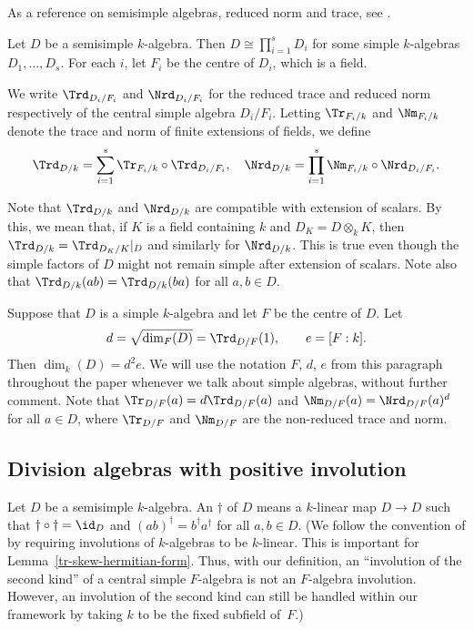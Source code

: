 As a reference on semisimple algebras, reduced norm and trace, see \cite[\S9]{Rei75}.

Let $D$ be a semisimple $k$-algebra.
Then $D \cong \prod_{i=1}^s D_i$ for some simple $k$-algebras $D_1, \dotsc, D_s$.
For each $i$, let $F_i$ be the centre of $D_i$, which is a field.

We write $\Trd_{D_i/F_i}$ and $\Nrd_{D_i/F_i}$ for the reduced trace and reduced norm respectively of the central simple algebra $D_i/F_i$.
Letting $\Tr_{F_i/k}$ and $\Nm_{F_i/k}$ denote the trace and norm of finite extensions of fields, we define\vspace*{-3pt}
\[
\Trd_{D/k} = \sum_{i=1}^s \Tr_{F_i/k} \circ \Trd_{D_i/F_i}, \quad \Nrd_{D/k} = \prod_{i=1}^s \Nm_{F_i/k} \circ \Nrd_{D_i/F_i}.
\]

Note that $\Trd_{D/k}$ and $\Nrd_{D/k}$ are compatible with extension of scalars.
By this, we mean that, if $K$ is a field containing $k$ and $D_K = D \otimes_k K$, then $\Trd_{D/k} = \Trd_{D_K/K}|_D$ and similarly for $\Nrd_{D/k}$.
This is true even though the simple factors of $D$ might not remain simple after extension of scalars.
Note also that $\Trd_{D/k}(ab) = \Trd_{D/k}(ba)$ for all $a, b \in D$.

Suppose that $D$ is a simple $k$-algebra and let $F$ be the centre of $D$.
Let\vspace*{-3pt}
\[
d = \sqrt{\dim_F(D)} = \Trd_{D/F}(1), \qquad e = [F:k].
\]
Then $\dim_k(D) = d^2e$.
We will use the notation $F$, $d$, $e$ from this paragraph throughout the paper whenever we talk about simple algebras, without further comment.
Note that $\Tr_{D/F}(a) = d\Trd_{D/F}(a)$ and $\Nm_{D/F}(a) = \Nrd_{D/F}(a)^d$ for all $a \in D$, where $\Tr_{D/F}$ and $\Nm_{D/F}$ are the non-reduced trace and norm.

\subsection{Division algebras with positive involution} \label{subsec:albert}

Let $D$ be a semisimple $k$\nobreakdash-alge\-bra.
An  $\dag$ of $D$ means a $k$-linear map $D \to D$ such that $\dag \circ \dag = \id_D$ and $(ab)^\dag = b^\dag a^\dag$ for all $a,b \in D$.
(We follow the convention of \cite[\S8]{Mil05} by requiring involutions of $k$-algebras to be $k$-linear. This is important for Lemma~\ref{tr-skew-hermitian-form}. Thus, with our definition, an ``involution of the second kind'' of a central simple $F$-algebra is not an $F$-algebra involution. However, an involution of the second kind can still be handled within our framework by taking $k$ to be the fixed subfield of~$F$.)

